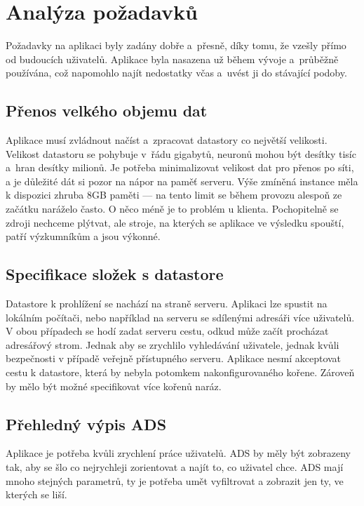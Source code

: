 \chapter{Analýza požadavků}
\label{chap:requirements}

Požadavky na aplikaci byly zadány dobře a~přesně, díky tomu, že vzešly přímo od budoucích uživatelů. Aplikace byla nasazena už během vývoje a~průběžně používána, což napomohlo najít nedostatky včas a~uvést ji do stávající podoby.

\section{Přenos velkého objemu dat}

Aplikace musí zvládnout načíst a~zpracovat datastory co největší velikosti. Velikost datastoru se pohybuje v~řádu gigabytů, neuronů mohou být desítky tisíc a~hran desítky milionů. Je potřeba minimalizovat velikost dat pro přenos po síti, a je důležité dát si pozor na nápor na paměť serveru. Výše zmíněná instance měla k dispozici zhruba 8GB paměti --- na tento limit se během provozu alespoň ze začátku naráželo často. O něco méně je to problém u klienta. Pochopitelně se zdroji nechceme plýtvat, ale stroje, na kterých se aplikace ve výsledku spouští, patří výzkumníkům a jsou výkonné.

\section{Specifikace složek s datastore}

Datastore k prohlížení se nachází na straně serveru. Aplikaci lze spustit na lokálním počítači, nebo například na serveru se sdílenými adresáři více uživatelů. V obou případech se hodí zadat serveru cestu, odkud může začít procházat adresářový strom. Jednak aby se zrychlilo vyhledávání uživatele, jednak kvůli bezpečnosti v případě veřejně přístupného serveru. Aplikace nesmí akceptovat cestu k datastore, která by nebyla potomkem nakonfigurovaného kořene. Zároveň by mělo být možné specifikovat více kořenů naráz.

\section{Přehledný výpis ADS}

Aplikace je potřeba kvůli zrychlení práce uživatelů. ADS by měly být zobrazeny tak, aby se šlo co nejrychleji zorientovat a najít to, co uživatel chce. ADS mají mnoho stejných parametrů, ty je potřeba umět vyfiltrovat a zobrazit jen ty, ve kterých se liší.


